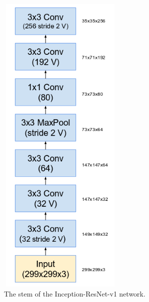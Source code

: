 \documentclass[a4paper,12pt, twoside]{NITKReport}
\begin{document}
\begin{figure}
\centering
\begin{minipage}[b]{0.4\textwidth}
   \includegraphics[height=15cm,width=6cm]{figure14.png}
    \caption{The stem of the Inception-ResNet-v1 network.}
    \label{14}
  \end{minipage}
  \hfill
  \begin{minipage}[b]{0.4\textwidth}

\end{minipage}
\end{figure}
\end{document}
